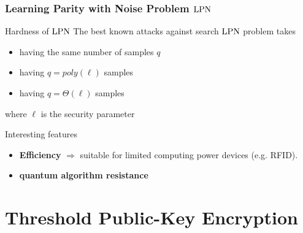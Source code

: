 \begin{frame}
 \frametitle{Learning Parity with Noise Problem $\mathrm{LPN}$}

  \begin{block}{Hardness of $\mathrm{LPN}$}
  The best known attacks against search $\mathrm{LPN}$ problem takes
  



   \begin{itemize}[<+->]
    \item {} having the same number of samples $q$
    \item {} having $q=poly(\ell)$ samples
    \item {} having $q= \mathcal{\varTheta}(\ell)$ samples
   \end{itemize} 
where $\ell$ is the security parameter
  \end{block}

  \begin{block}{Interesting features}
    \begin{itemize}[<+->]
      \item \textbf{Efficiency} $\Rightarrow$ suitable for limited computing power devices (e.g. RFID).
      \item \textbf{quantum algorithm resistance}
    \end{itemize}
  \end{block}

\end{frame}

\section{Threshold Public-Key Encryption}

